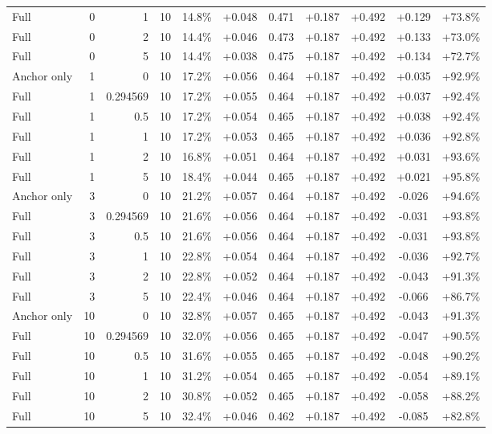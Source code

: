 \begin{table}[htbp]
\begin{tabular}{lrrrccccccc}
Full & 0 & 1 & 10 & 14.8\% & +0.048 & 0.471 & +0.187 & +0.492 & +0.129 & +73.8\% \\
Full & 0 & 2 & 10 & 14.4\% & +0.046 & 0.473 & +0.187 & +0.492 & +0.133 & +73.0\% \\
Full & 0 & 5 & 10 & 14.4\% & +0.038 & 0.475 & +0.187 & +0.492 & +0.134 & +72.7\% \\
Anchor only & 1 & 0 & 10 & 17.2\% & +0.056 & 0.464 & +0.187 & +0.492 & +0.035 & +92.9\% \\
Full & 1 & 0.294569 & 10 & 17.2\% & +0.055 & 0.464 & +0.187 & +0.492 & +0.037 & +92.4\% \\
Full & 1 & 0.5 & 10 & 17.2\% & +0.054 & 0.465 & +0.187 & +0.492 & +0.038 & +92.4\% \\
Full & 1 & 1 & 10 & 17.2\% & +0.053 & 0.465 & +0.187 & +0.492 & +0.036 & +92.8\% \\
Full & 1 & 2 & 10 & 16.8\% & +0.051 & 0.464 & +0.187 & +0.492 & +0.031 & +93.6\% \\
Full & 1 & 5 & 10 & 18.4\% & +0.044 & 0.465 & +0.187 & +0.492 & +0.021 & +95.8\% \\
Anchor only & 3 & 0 & 10 & 21.2\% & +0.057 & 0.464 & +0.187 & +0.492 & -0.026 & +94.6\% \\
Full & 3 & 0.294569 & 10 & 21.6\% & +0.056 & 0.464 & +0.187 & +0.492 & -0.031 & +93.8\% \\
Full & 3 & 0.5 & 10 & 21.6\% & +0.056 & 0.464 & +0.187 & +0.492 & -0.031 & +93.8\% \\
Full & 3 & 1 & 10 & 22.8\% & +0.054 & 0.464 & +0.187 & +0.492 & -0.036 & +92.7\% \\
Full & 3 & 2 & 10 & 22.8\% & +0.052 & 0.464 & +0.187 & +0.492 & -0.043 & +91.3\% \\
Full & 3 & 5 & 10 & 22.4\% & +0.046 & 0.464 & +0.187 & +0.492 & -0.066 & +86.7\% \\
Anchor only & 10 & 0 & 10 & 32.8\% & +0.057 & 0.465 & +0.187 & +0.492 & -0.043 & +91.3\% \\
Full & 10 & 0.294569 & 10 & 32.0\% & +0.056 & 0.465 & +0.187 & +0.492 & -0.047 & +90.5\% \\
Full & 10 & 0.5 & 10 & 31.6\% & +0.055 & 0.465 & +0.187 & +0.492 & -0.048 & +90.2\% \\
Full & 10 & 1 & 10 & 31.2\% & +0.054 & 0.465 & +0.187 & +0.492 & -0.054 & +89.1\% \\
Full & 10 & 2 & 10 & 30.8\% & +0.052 & 0.465 & +0.187 & +0.492 & -0.058 & +88.2\% \\
Full & 10 & 5 & 10 & 32.4\% & +0.046 & 0.462 & +0.187 & +0.492 & -0.085 & +82.8\% \\

\end{tabular}
\end{table}
